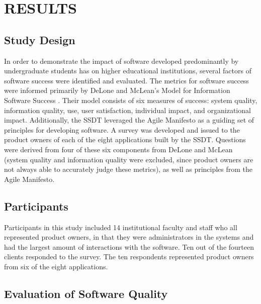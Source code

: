 \section{RESULTS}

\subsection{Study Design}
In order to demonstrate the impact of software developed predominantly by undergraduate students has on higher educational institutions, several factors of software success were identified and evaluated.  The metrics for software success were informed primarily by DeLone and McLean's Model for Information Software Success \cite{delone1992softwaresuccess}. Their model consists of six measures of success: system quality, information quality, use, user satisfaction, individual impact, and organizational impact. Additionally, the SSDT leveraged the Agile Manifesto \cite{agilemanifesto} as a guiding set of principles for developing software. A survey was developed and issued to the product owners of each of the eight applications built by the SSDT. Questions were derived from four of these six components from DeLone and McLean (system quality and information quality were excluded, since product owners are not always able to accurately judge these metrics), as well as principles from the Agile Manifesto. %

\subsection{Participants}
Participants in this study included 14 institutional faculty and staff who all represented product owners, in that they were administrators in the systems and had the largest amount of interactions with the software. Ten out of the fourteen clients responded to the survey. The ten respondents represented product owners from six of the eight applications.

\subsection{Evaluation of Software Quality}
